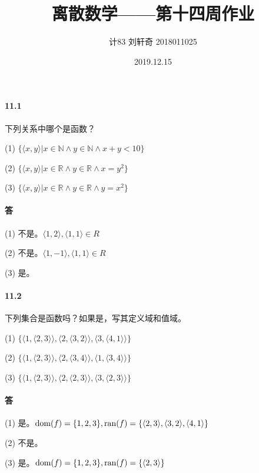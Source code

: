 \documentclass[UTF8]{ctexart}
\title{离散数学——第十四周作业}
\author{计83  刘轩奇  2018011025}
\date{2019.12.15}
\newcommand{\snatural}{\mathbb{N}}
\newcommand{\sreal}{\mathbb{R}}
\newcommand{\ran}{{\rm ran}}
\newcommand{\dom}{{\rm dom}}
\begin{document}
\maketitle

\paragraph{11.1} \label{11.1}
    下列关系中哪个是函数？

    (1) $ \{ \langle x,y \rangle |x \in \snatural \land y \in \snatural \land x+y < 10 \} $

    (2) $ \{ \langle x,y \rangle | x \in \sreal \land y \in \sreal \land x = y^2 \} $

    (3) $ \{ \langle x,y \rangle | x \in \sreal \land y \in \sreal \land y = x^2 \} $

\paragraph{答}
    (1) 不是。$ \langle 1,2 \rangle , \langle 1,1 \rangle \in R$

    (2) 不是。$ \langle 1,-1 \rangle , \langle 1,1 \rangle \in R$

    (3) 是。

\paragraph{11.2} \label{11.2}
    下列集合是函数吗？如果是，写其定义域和值域。

    (1)  $\{ \langle 1, \langle 2,3 \rangle \rangle , \langle 2, \langle 3,2 \rangle \rangle , \langle 3, \langle 4,1 \rangle \rangle \}$

    (2) $\{ \langle 1, \langle 2,3 \rangle \rangle , \langle 2, \langle 3,4 \rangle \rangle , \langle 1, \langle 3,4 \rangle \rangle \}$
    
    (3) $\{ \langle 1, \langle 2,3 \rangle \rangle , \langle 2, \langle 2,3 \rangle \rangle , \langle 3, \langle 2,3 \rangle \rangle \} $

\paragraph{答}
    (1) 是。$\dom(f) = \{ 1,2,3 \} , \ran(f) = \{ \langle 2,3 \rangle , \langle 3,2 \rangle , \langle 4,1 \rangle \} $

    (2) 不是。

    (3) 是。$\dom(f) = \{ 1,2,3 \} , \ran(f) = \{ \langle 2,3 \rangle \} $
\end{document}
